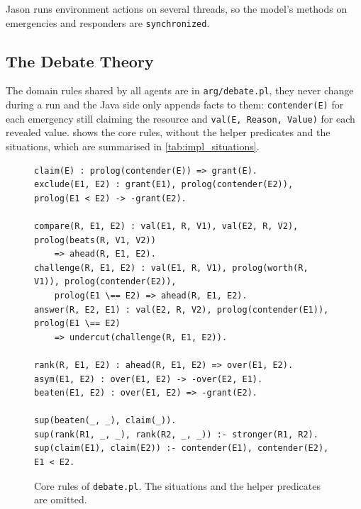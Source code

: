 Jason runs environment actions on several threads, so the model's methods on emergencies and responders are \texttt{synchronized}.

\subsection{The Debate Theory}\label{subsec:impl_theory}

The domain rules shared by all agents are in \texttt{arg/debate.pl}, they never change during a run and the Java side only appends facts to them: \texttt{contender(E)} for each emergency still claiming the resource and \texttt{val(E, Reason, Value)} for each revealed value.
 shows the core rules, without the helper predicates and the situations, which are summarised in \cref{tab:impl_situations}.

\begin{figure}[htbp]
\centering
\begin{minipage}{0.95\textwidth}
\footnotesize
\begin{verbatim}
claim(E) : prolog(contender(E)) => grant(E).
exclude(E1, E2) : grant(E1), prolog(contender(E2)), prolog(E1 < E2) -> -grant(E2).

compare(R, E1, E2) : val(E1, R, V1), val(E2, R, V2), prolog(beats(R, V1, V2))
    => ahead(R, E1, E2).
challenge(R, E1, E2) : val(E1, R, V1), prolog(worth(R, V1)), prolog(contender(E2)),
    prolog(E1 \== E2) => ahead(R, E1, E2).
answer(R, E2, E1) : val(E2, R, V2), prolog(contender(E1)), prolog(E1 \== E2)
    => undercut(challenge(R, E1, E2)).

rank(R, E1, E2) : ahead(R, E1, E2) => over(E1, E2).
asym(E1, E2) : over(E1, E2) -> -over(E2, E1).
beaten(E1, E2) : over(E1, E2) => -grant(E2).

sup(beaten(_, _), claim(_)).
sup(rank(R1, _, _), rank(R2, _, _)) :- stronger(R1, R2).
sup(claim(E1), claim(E2)) :- contender(E1), contender(E2), E1 < E2.
\end{verbatim}
\end{minipage}
\caption{Core rules of \texttt{debate.pl}. The situations and the helper predicates are omitted.}
\label{fig:impl_theory}
\end{figure}

